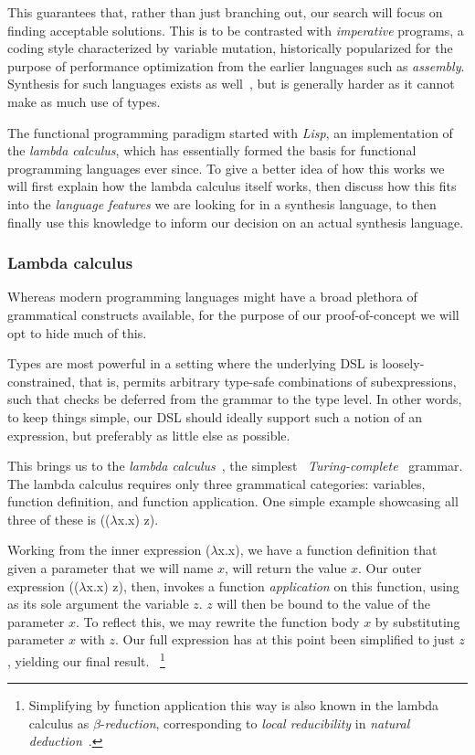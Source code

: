 \documentclass{article}
\begin{document}
This guarantees that, rather than just branching out,
our search will focus on finding acceptable solutions.
This is to be contrasted with \emph{imperative} programs,
a coding style characterized by variable mutation,
historically popularized for the purpose of performance optimization from the earlier languages such as \emph{assembly}.
Synthesis for such languages exists as well~\citep{shi2019frangel},
but is generally harder as it cannot make as much use of types.

The functional programming paradigm started with \emph{Lisp},
an implementation of the \emph{lambda calculus},
which has essentially formed the basis for functional programming languages ever since.
To give a better idea of how this works we will first explain how the lambda calculus itself works,
then discuss how this fits into the \emph{language features} we are looking for in a synthesis language,
to then finally use this knowledge to inform our decision on an actual synthesis language.

\subsubsection{Lambda calculus} \label{sec:lambdacalc}

Whereas modern programming languages might have a broad plethora of grammatical constructs available,
for the purpose of our proof-of-concept we will opt to hide much of this.

Types are most powerful in a setting where the underlying DSL is loosely-constrained,
that is, permits arbitrary type-safe combinations of subexpressions,
such that checks be deferred from the grammar to the type level.
In other words, to keep things simple,
our DSL should ideally support such a notion of an expression,
but preferably as little else as possible.

This brings us to the \emph{lambda calculus}~\citep{lambdacalculus},
the simplest~\citep{selinger2008lecture}
\emph{Turing-complete}~\citep{turing1936computable} grammar.
The lambda calculus requires only three grammatical categories:
variables, function definition, and function application.
One simple example showcasing all three of these is (($\lambda$x.x) z).

Working from the inner expression ($\lambda$x.x),
we have a function definition that given a parameter that we will name $x$, will return the value $x$.
Our outer expression (($\lambda$x.x) z), then,
invokes a function \emph{application} on this function,
using as its sole argument the variable $z$.
$z$ will then be bound to the value of the parameter $x$.
To reflect this, we may rewrite the function body $x$ by substituting parameter $x$ with $z$.
Our full expression has at this point been simplified to just $z$,
yielding our final result.%
~\footnote{
    Simplifying by function application this way is also known in the lambda calculus as $\beta$-\emph{reduction},
    corresponding to \emph{local reducibility} in \emph{natural deduction}~\citep{gentzen1935untersuchungen}.
}
\end{document}
